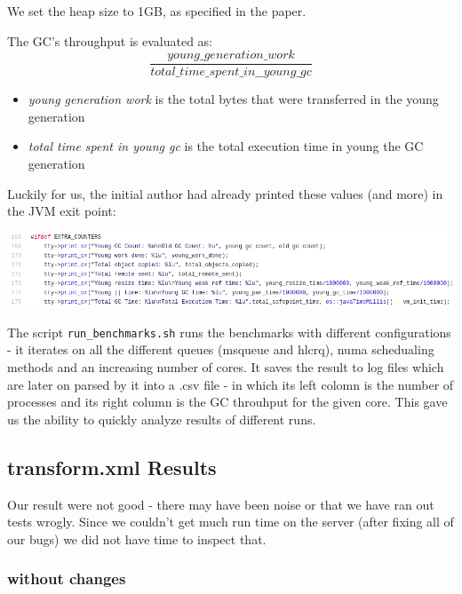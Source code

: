 \documentclass{article}
\begin{document}
 We set the heap size to 1GB, as specified in the paper.

 The GC's throughput is evaluated as:
 \begin{equation}
	 \frac{young\_generation\_work}{total\_time\_spent\_in\_\_young\_gc}
 \end{equation}

 \begin{itemize}
   \item \textit{young generation work} is the total bytes that were transferred in the young generation
   \item \textit{total time spent in young gc} is the total execution time in young the GC generation
 \end{itemize}

 Luckily for us, the initial author had already printed these values (and more) in the JVM exit point:

 \includegraphics[width=\textwidth]{gc-debug-prints.png}

 The script \texttt{run\_benchmarks.sh} runs the benchmarks with different configurations - it iterates on all the different queues (msqueue and hlcrq), numa schedualing methods and an increasing number of cores. It saves the result to log files which are later on parsed by it into a .csv file - in which its left colomn is the number of processes and its right column is the GC throuhput for the given core.
This gave us the ability to quickly analyze results of different runs.

 \newpage

 \subsection{transform.xml Results}
 Our result were not good - there may have been noise or that we have ran out tests wrogly. Since we couldn't get much run time on the server (after fixing all of our bugs) we did not have time to inspect that.

 \subsubsection{without changes}
\end{document}
